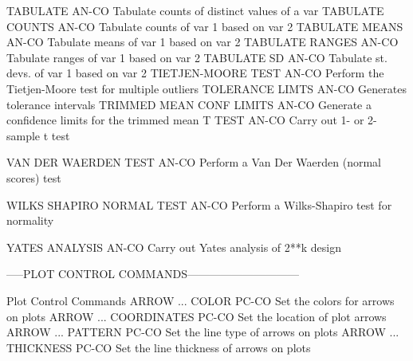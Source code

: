TABULATE                    AN-CO Tabulate counts of distinct values of a var
TABULATE COUNTS             AN-CO Tabulate counts of var 1 based on var 2
TABULATE MEANS              AN-CO Tabulate means of var 1 based on var 2
TABULATE RANGES             AN-CO Tabulate ranges of var 1 based on var 2
TABULATE SD                 AN-CO Tabulate st. devs. of var 1 based on var 2
TIETJEN-MOORE TEST          AN-CO Perform the Tietjen-Moore test for multiple outliers
TOLERANCE LIMTS             AN-CO Generates tolerance intervals
TRIMMED MEAN CONF LIMITS    AN-CO Generate a confidence limits for the trimmed mean
T TEST                      AN-CO Carry out 1- or 2-sample t test

VAN DER WAERDEN TEST        AN-CO Perform a Van Der Waerden (normal scores) test

WILKS SHAPIRO NORMAL TEST   AN-CO Perform a Wilks-Shapiro test for normality

YATES ANALYSIS              AN-CO Carry out Yates analysis of 2**k design

-----PLOT CONTROL COMMANDS------------------------------

Plot Control Commands
ARROW ... COLOR             PC-CO Set the colors for arrows on plots
ARROW ... COORDINATES       PC-CO Set the location of plot arrows
ARROW ... PATTERN           PC-CO Set the line type of arrows on plots
ARROW ... THICKNESS         PC-CO Set the line thickness of arrows on plots

